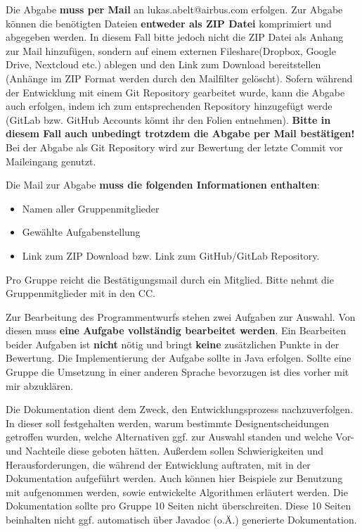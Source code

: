 \documentclass[a4paper,
			   fontsize=12pt]{article}
\begin{document}
Die Abgabe \textbf{muss per Mail} an lukas.abelt@airbus.com erfolgen. Zur Abgabe können die benötigten Dateien \textbf{entweder als ZIP Datei} komprimiert und abgegeben werden. In diesem Fall bitte jedoch nicht die ZIP Datei als Anhang zur Mail hinzufügen,
sondern auf einem externen Fileshare(Dropbox, Google Drive, Nextcloud etc.) ablegen und den Link zum Download bereitstellen (Anhänge im ZIP Format werden durch den Mailfilter gelöscht). Sofern während der Entwicklung mit einem Git Repository gearbeitet wurde,
kann die Abgabe auch erfolgen, indem ich zum entsprechenden Repository hinzugefügt werde (GitLab bzw. GitHub Accounts könnt ihr den Folien entnehmen). \textbf{Bitte in diesem Fall auch unbedingt trotzdem die Abgabe per Mail bestätigen!} Bei der Abgabe als
Git Repository wird zur Bewertung der letzte Commit vor Maileingang genutzt.

Die Mail zur Abgabe \textbf{muss die folgenden Informationen enthalten}:
\begin{itemize}
	\item Namen aller Gruppenmitglieder
	\item Gewählte Aufgabenstellung
	\item Link zum ZIP Download bzw. Link zum GitHub/GitLab Repository.
\end{itemize}
Pro Gruppe reicht die Bestätigungsmail durch ein Mitglied. Bitte nehmt die Gruppenmitglieder mit in den CC.

Zur Bearbeitung des Programmentwurfs stehen zwei Aufgaben zur Auswahl. Von diesen muss \textbf{eine Aufgabe vollständig bearbeitet werden}. Ein Bearbeiten beider Aufgaben
ist \textbf{nicht} nötig und bringt \textbf{keine} zusätzlichen Punkte in der Bewertung. Die Implementierung der Aufgabe sollte in Java erfolgen. Sollte eine Gruppe die Umsetzung in
einer anderen Sprache bevorzugen ist dies vorher mit mir abzuklären.

Die Dokumentation dient dem Zweck, den Entwicklungsprozess nachzuverfolgen. In dieser soll festgehalten werden, warum bestimmte Designentscheidungen getroffen
wurden, welche Alternativen ggf. zur Auswahl standen und welche Vor- und Nachteile diese geboten hätten. Außerdem sollen Schwierigkeiten und Herausforderungen, 
die während der Entwicklung auftraten, mit in der Dokumentation aufgeführt werden. Auch können hier Beispiele zur Benutzung mit aufgenommen werden, sowie entwickelte 
Algorithmen erläutert werden. Die Dokumentation sollte pro Gruppe 10 Seiten nicht überschreiten. Diese 10 Seiten beinhalten nicht ggf. automatisch über Javadoc (o.Ä.) generierte Dokumentation.
\end{document}
